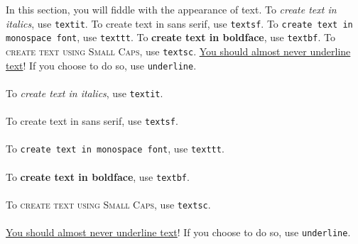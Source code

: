 In this section, you will fiddle with the appearance of text. To \textit{create text in italics}, use \texttt{textit}. To \textsf{create text in sans serif}, use \texttt{textsf}. To \texttt{create text in monospace font}, use \texttt{texttt}. To \textbf{create text in boldface}, use \texttt{textbf}. To \textsc{create text using Small Caps}, use \texttt{textsc}. \underline{You should almost never underline text}! If you choose to do so, use \texttt{underline}.

        \paragraph{}To \textit{create text in italics}, use \texttt{textit}. 
        \paragraph{}To \textsf{create text in sans serif}, use \texttt{textsf}. 
        \paragraph{}To \texttt{create text in monospace font}, use \texttt{texttt}. 
        \paragraph{}To \textbf{create text in boldface}, use \texttt{textbf}. 
        \paragraph{}To \textsc{create text using Small Caps}, use \texttt{textsc}. 
        \paragraph{}\underline{You should almost never underline text}! If you choose to do so, use \texttt{underline}.

